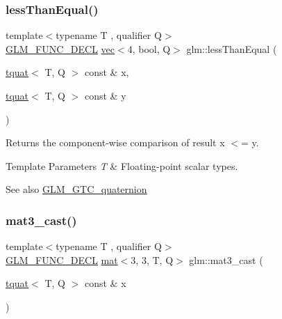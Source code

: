 \subsubsection{\texorpdfstring{less\+Than\+Equal()}{lessThanEqual()}}
{\footnotesize\ttfamily template$<$typename T , qualifier Q$>$ \\
\mbox{\hyperlink{setup_8hpp_ab2d052de21a70539923e9bcbf6e83a51}{G\+L\+M\+\_\+\+F\+U\+N\+C\+\_\+\+D\+E\+CL}} \mbox{\hyperlink{structglm_1_1vec}{vec}}$<$4, bool, Q$>$ glm\+::less\+Than\+Equal (\begin{DoxyParamCaption}\item[{\mbox{\hyperlink{structglm_1_1tquat}{tquat}}$<$ T, Q $>$ const \&}]{x,  }\item[{\mbox{\hyperlink{structglm_1_1tquat}{tquat}}$<$ T, Q $>$ const \&}]{y }\end{DoxyParamCaption})}

Returns the component-\/wise comparison of result x $<$= y.


\begin{DoxyTemplParams}{Template Parameters}
{\em T} & Floating-\/point scalar types.\\
\hline
\end{DoxyTemplParams}
\begin{DoxySeeAlso}{See also}
\mbox{\hyperlink{group__gtc__quaternion}{G\+L\+M\+\_\+\+G\+T\+C\+\_\+quaternion}} 
\end{DoxySeeAlso}
\mbox{\label{group__gtc__quaternion_ga6e88f15c94effe737c876d21ea0db101}} 
\subsubsection{\texorpdfstring{mat3\+\_\+cast()}{mat3\_cast()}}
{\footnotesize\ttfamily template$<$typename T , qualifier Q$>$ \\
\mbox{\hyperlink{setup_8hpp_ab2d052de21a70539923e9bcbf6e83a51}{G\+L\+M\+\_\+\+F\+U\+N\+C\+\_\+\+D\+E\+CL}} \mbox{\hyperlink{structglm_1_1mat}{mat}}$<$3, 3, T, Q$>$ glm\+::mat3\+\_\+cast (\begin{DoxyParamCaption}\item[{\mbox{\hyperlink{structglm_1_1tquat}{tquat}}$<$ T, Q $>$ const \&}]{x }\end{DoxyParamCaption})}

